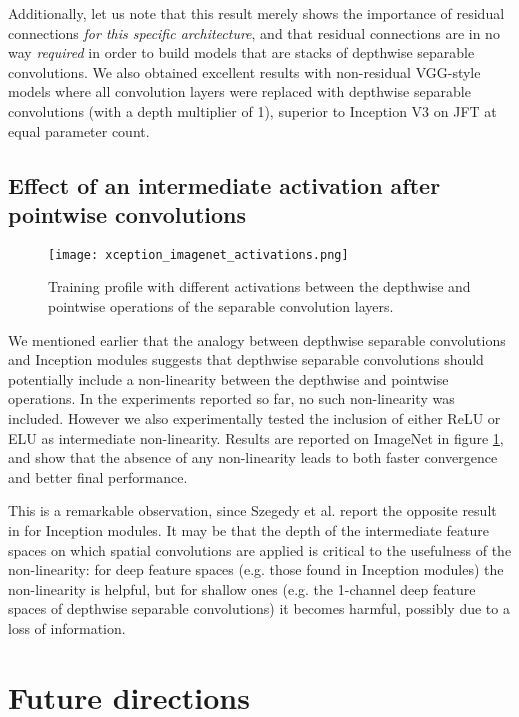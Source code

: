 \documentclass[10pt,twocolumn,letterpaper]{article}
\begin{document}
Additionally, let us note that this result merely shows the importance of residual connections \textit{for this specific architecture}, and that residual connections are in no way \textit{required} in order to build models that are stacks of depthwise separable convolutions. We also obtained excellent results with non-residual VGG-style models where all convolution layers were replaced with depthwise separable convolutions (with a depth multiplier of 1), superior to Inception V3 on JFT at equal parameter count.


\subsection{Effect of an intermediate activation after pointwise convolutions}

\begin{figure}[!ht]
  \caption{Training profile with different activations between the depthwise and pointwise operations of the separable convolution layers.}
  \label{xception_imagenet_activations}
  \centering
    \texttt{[image: xception\_imagenet\_activations.png]}
\end{figure}


We mentioned earlier that the analogy between depthwise separable convolutions and Inception modules suggests that depthwise separable convolutions should potentially include a non-linearity between the depthwise and pointwise operations. In the experiments reported so far, no such non-linearity was included. However we also experimentally tested the inclusion of either ReLU or ELU \cite{clevert15} as intermediate non-linearity. Results are reported on ImageNet in figure \ref{xception_imagenet_activations}, and show that the absence of any non-linearity leads to both faster convergence and better final performance.

This is a remarkable observation, since Szegedy et al. report the opposite result in \cite{szegedy2015rethinking} for Inception modules. It may be that the depth of the intermediate feature spaces on which spatial convolutions are applied is critical to the usefulness of the non-linearity: for deep feature spaces (e.g. those found in Inception modules) the non-linearity is helpful, but for shallow ones (e.g. the 1-channel deep feature spaces of depthwise separable convolutions) it becomes harmful, possibly due to a loss of information.


\section{Future directions}
\end{document}

